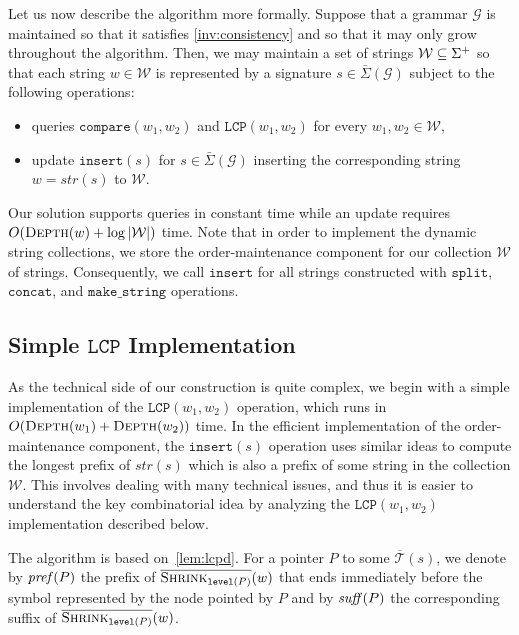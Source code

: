 \documentclass[a4paper]{article}
\theoremstyle{remark}
\newcommand{\makeop}{\mathtt{make\_string}}
\newcommand{\compop}{\mathtt{compare}}
\newcommand{\concop}{\mathtt{concat}}
\newcommand{\splitop}{\mathtt{split}}
\newcommand{\lcpop}{\mathtt{LCP}}
\newcommand{\sigs}{\bar{\Sigma}}
\newcommand{\depth}{\textsc{Depth}}
\newcommand{\cshrink}[1]{\ensuremath{\overline{\textsc{Shrink}_{#1}}}}
\newcommand{\str}{w}
\newcommand{\grammar}{\mathcal{G}}
\newcommand{\sstr}{\textit{str}}
\newcommand{\ustree}{\mathcal{\overline{T}}}
\newcommand{\coll}{\mathcal{W}}
\newcommand{\itlevel}{\mathtt{level}}
\newcommand{\insertop}{\mathtt{insert}}
\begin{document}
Let us now describe the algorithm more formally.
Suppose that a grammar $\grammar$ is maintained so that it satisfies \cref{inv:consistency}
and so that it may only grow throughout the algorithm.
Then, we may maintain a set of strings $\coll\sub \Sigma^+$ so that each string $w\in \coll$
is represented by a signature $s\in \sigs(\grammar)$ subject to the following operations:
\begin{itemize}
  \item queries $\compop(w_1,w_2)$ and $\lcpop(w_1,w_2)$ for every $w_1,w_2\in \coll$,
  \item update $\insertop(s)$ for  $s\in \sigs(\grammar)$  inserting the corresponding string $w=\sstr(s)$ to $\coll$.
\end{itemize}
Our solution supports queries in constant time while an update requires $O(\depth(w)+\log |\coll|)$ time.
Note that in order to implement the dynamic string collections, we store the order-maintenance component
for our collection $\coll$ of strings. Consequently, we call $\insertop$ for all strings
constructed with $\splitop$, $\concop$, and $\makeop$ operations.

\subsection{Simple $\lcpop$ Implementation}
As the technical side of our construction is quite complex, we begin with a simple implementation of the $\lcpop(w_1,w_2)$ operation,
which runs in $O(\depth(w_1)+\depth(w_2))$ time.
In the efficient implementation of the order-maintenance component, the $\insertop(s)$ operation uses similar ideas
to compute the longest prefix of $\sstr(s)$ which is also a prefix of some string in the collection $\coll$.
This involves dealing with many technical issues,  and thus it is easier to understand the key combinatorial idea by analyzing the $\lcpop(w_1,w_2)$ implementation described below.


The algorithm is based on~\cref{lem:lcpd}.
For a pointer $P$ to some $\ustree(s)$, we denote by $\mathit{pref}(P)$ the prefix of $\cshrink{\itlevel(P)}(\str)$ that ends immediately before the symbol represented by the node pointed by $P$
and by $\mathit{suff}(P)$ the corresponding suffix of $\cshrink{\itlevel(P)}(\str)$.
\end{document}
